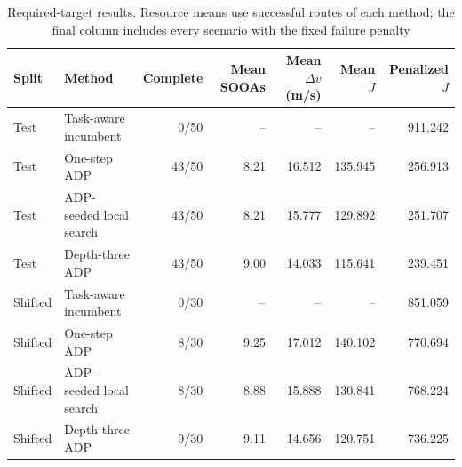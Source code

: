 \begin{table}[t]
  \centering
  \caption{Required-target results. Resource means use successful routes of each method; the final column includes every scenario with the fixed failure penalty}
  \label{tab:paired-aggregate}
  \renewcommand{\arraystretch}{1.08}
  \setlength{\tabcolsep}{5pt}
  \footnotesize
  \begin{tabular}{@{}llrrrrr@{}}
    \toprule
    Split & Method & Complete & Mean SOOAs & Mean $\Delta v$ (m/s) & Mean $J$ & Penalized $J$ \\
    \midrule
    Test & Task-aware incumbent & 0/50 & -- & -- & -- & 911.242 \\
    Test & One-step ADP & 43/50 & 8.21 & 16.512 & 135.945 & 256.913 \\
    Test & ADP-seeded local search & 43/50 & 8.21 & 15.777 & 129.892 & 251.707 \\
    Test & Depth-three ADP & 43/50 & 9.00 & 14.033 & 115.641 & 239.451 \\
    Shifted & Task-aware incumbent & 0/30 & -- & -- & -- & 851.059 \\
    Shifted & One-step ADP & 8/30 & 9.25 & 17.012 & 140.102 & 770.694 \\
    Shifted & ADP-seeded local search & 8/30 & 8.88 & 15.888 & 130.841 & 768.224 \\
    Shifted & Depth-three ADP & 9/30 & 9.11 & 14.656 & 120.751 & 736.225 \\
    \bottomrule
  \end{tabular}
\end{table}
